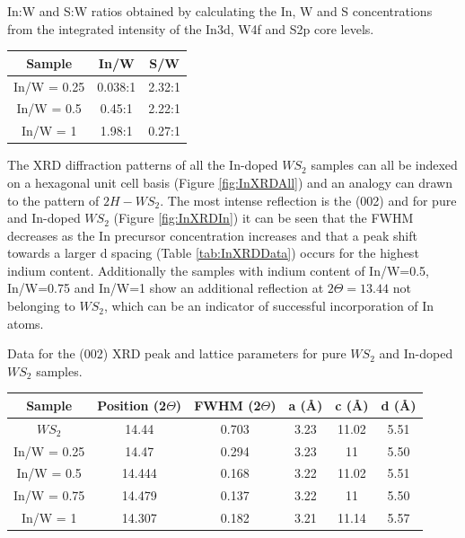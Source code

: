 \begin{table}[!ht]
\caption{In:W and S:W ratios obtained by calculating the In, W and S concentrations from the integrated intensity of the In3d, W4f and S2p core levels.}
\label{tab:InRatios}
\end{table}

\begin{center}
\begin{tabular}{c|cc}

Sample 		& In/W 		& S/W\\\hline
In/W = 0.25 & 0.038:1 	& 2.32:1\\
In/W = 0.5	& 0.45:1	& 2.22:1\\
In/W = 1	& 1.98:1	& 0.27:1

\end{tabular}
\end{center}

The XRD diffraction patterns of all the In-doped $WS_2$ samples can all be indexed on a hexagonal unit cell basis (Figure \ref{fig:InXRDAll}) and an analogy can drawn to the pattern of $2H-WS_2$. The most intense reflection is the (002) and for pure and In-doped $WS_2$ (Figure \ref{fig:InXRDIn}) it can be seen that the FWHM decreases as the In precursor concentration increases and that a peak shift towards a larger d spacing (Table \ref{tab:InXRDData}) occurs for the highest indium content. Additionally the samples with indium content of In/W=0.5, In/W=0.75 and In/W=1 show an additional reflection at $2{\Theta}=13.44$ not belonging to $WS_2$, which can be an indicator of successful incorporation of In atoms.

\begin{table}[!ht]
\caption{Data for the (002) XRD peak and lattice parameters for pure $WS_2$ and In-doped $WS_2$ samples.}
\label{tab:InXRDData}
\end{table}

\begin{center}
\begin{tabular}{c|ccccc}

Sample 		& Position (2$\Theta$)	& FWHM (2$\Theta$)	& a (\r{A})	& c (\r{A})	& d (\r{A})	\\\hline
$WS_2$	 	& 14.44 				& 0.703				& 3.23		& 11.02		& 5.51		\\
In/W = 0.25	& 14.47					& 0.294				& 3.23		& 11		& 5.50		\\
In/W = 0.5	& 14.444				& 0.168				& 3.22		& 11.02		& 5.51		\\
In/W = 0.75	& 14.479				& 0.137				& 3.22		& 11		& 5.50		\\
In/W = 1	& 14.307				& 0.182				& 3.21		& 11.14		& 5.57

\end{tabular}
\end{center}


